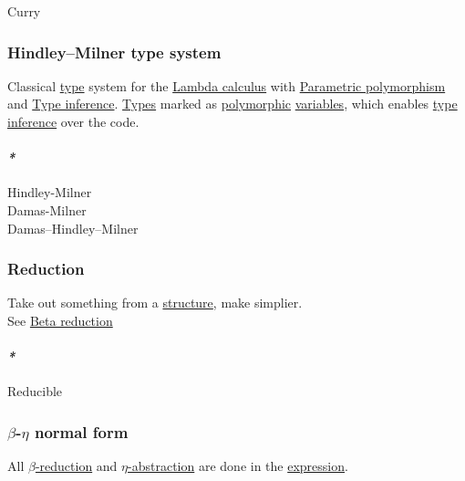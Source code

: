 \documentclass[11pt]{article}
\begin{document}
\label{org44f1752}Curry\\

\subsubsection{\label{org2acbd48}Hindley–Milner type system}
\label{sec:orgc5b137f}
Classical \hyperref[org4fbaeb8]{type} system for the \hyperref[org617da6f]{Lambda calculus} with \hyperref[org9b7bee7]{Parametric polymorphism} and \hyperref[orgf4f2545]{Type inference}. \hyperref[org3927fd9]{Types} marked as \hyperref[org84d7fee]{polymorphic} \hyperref[orgd3f3ade]{variables}, which enables \hyperref[orgf4f2545]{type inference} over the code.\\

\paragraph{\emph{*}}
\label{sec:org5ff837c}

\label{org374d650}Hindley-Milner\\
\label{org65bbb2c}Damas-Milner\\
\label{org468421a}Damas–Hindley–Milner\\

\subsubsection{\label{org102c2e5}Reduction}
\label{sec:org8354e41}
Take out something from a \hyperref[org93ee82c]{structure}, make simplier.\\

See \hyperref[orgb158a69]{Beta reduction}\\

\paragraph{\emph{*}}
\label{sec:org3e78ba9}

\label{org3d6481e}Reducible\\

\subsubsection{\label{orgf3985db}\(\beta\)-\(\eta\) normal form}
\label{sec:orgf7f5452}
All \hyperref[orgf583adb]{\(\beta\)-reduction} and \hyperref[orgda12a49]{\(\eta\)-abstraction} are done in the \hyperref[org667db83]{expression}.\\
\end{document}
